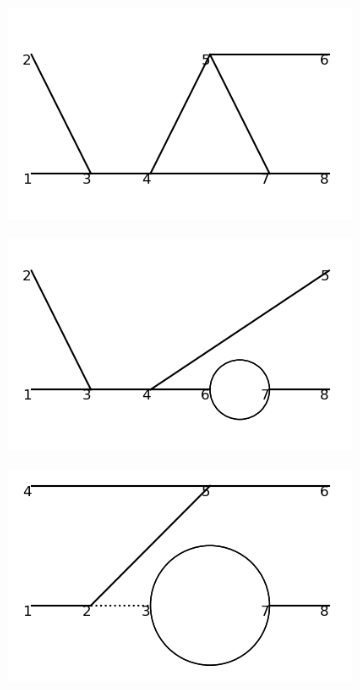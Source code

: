 \documentclass[11pt,a4paper,twoside,pdf]{article}
\numberwithin{equation}{section}
\begin{document}
\begin{figure}[h!]
\begin{subfigure}[t]{0.16\textwidth}
    \end{subfigure}
    \hfill
    \begin{subfigure}[t]{0.16\textwidth}
        \centering
        \includegraphics[width=\textwidth]{plots/order4_2to2/10.png}
    \end{subfigure}
    \hfill 
    \begin{subfigure}[t]{0.16\textwidth}
        \centering
        \includegraphics[width=\textwidth]{plots/order4_2to2/11.png}
    \end{subfigure}
    \hfill
    \begin{subfigure}[t]{0.16\textwidth}
        \centering
        \includegraphics[width=\textwidth]{plots/order4_2to2/12.png}

\end{subfigure}
\end{figure}
\end{document}
